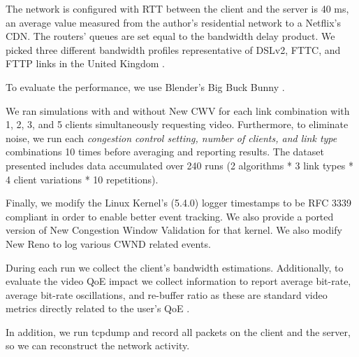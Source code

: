 \documentclass[10pt,sigconf,anonymous]{acmart}
\begin{document}
The network is configured with RTT between the client and the server is 40 ms, an average value measured from the author's residential network to a Netflix's CDN. The routers' queues are set equal to the bandwidth delay product. We picked three different bandwidth profiles representative of DSLv2, FTTC, and FTTP links in the United Kingdom \cite{online-ofcom-report}.

To evaluate the performance, we use Blender's Big Buck Bunny \cite{online-bbb}.

We ran simulations with and without New CWV for each link combination with 1, 2, 3, and 5 clients simultaneously requesting video. Furthermore, to eliminate noise, we run each \textit{congestion control setting, number of clients, and link type} combinations 10 times before averaging and reporting results. The dataset presented includes data accumulated over 240 runs (2 algorithms * 3 link types * 4 client variations * 10 repetitions). 

Finally, we modify the Linux Kernel's (5.4.0) logger timestamps to be RFC 3339 compliant in order to enable better event tracking. We also provide a ported version of New Congestion Window Validation \cite{rfc7661-2015-fairhurst-new-cwnd-validation} for that kernel. We also modify New Reno to log various CWND related events.


During each run we collect the client's bandwidth estimations. Additionally, to evaluate the video QoE impact we collect information to report average bit-rate, average bit-rate oscillations, and re-buffer ratio as these are standard video metrics directly related to the user's QoE \cite{Spiteri-2019-from-theory-to-practice-sabre, Yin-2015-a-control-theoritic-approach, Dobrian-2013-understanding-the-impact-of-video-quality}.

In addition, we run tcpdump and record all packets on the client and the server, so we can reconstruct the network activity.


\end{document}
